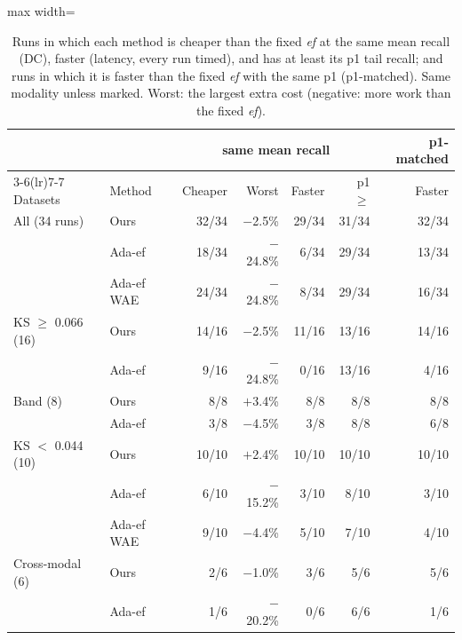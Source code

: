 \documentclass[twocolumn]{svjour3}
\newcommand{\ef}{\textit{ef}}
\begin{document}
\begin{table}[t]
  \caption{Runs in which each method is cheaper than the fixed \ef{} at the same mean recall (DC),
  faster (latency, every run timed), and has at least its p1 tail recall; and runs in which it is
  faster than the fixed \ef{} with the same p1 (p1-matched). Same modality unless marked. Worst:
  the largest extra cost (negative: more work than the fixed \ef{}).}
  \label{tab:counts}
  \centering\footnotesize\setlength{\tabcolsep}{3.5pt}
  \begin{adjustbox}{max width=\linewidth}\begin{tabular}{llrrrrr}
    \toprule
    & & \multicolumn{4}{c}{same mean recall} & p1-matched \\
    \cmidrule(lr){3-6}\cmidrule(lr){7-7}
    Datasets & Method & Cheaper & Worst & Faster & p1 $\geq$ & Faster \\
    \midrule
    All (34 runs)        & Ours        & 32/34 & $-$2.5\%  & 29/34 & 31/34 & 32/34 \\
                         & Ada-ef      & 18/34 & $-$24.8\% &  6/34 & 29/34 & 13/34 \\
                         & Ada-ef WAE  & 24/34 & $-$24.8\% &  8/34 & 29/34 & 16/34 \\
    \midrule
    KS $\geq$ 0.066 (16) & Ours        & 14/16 & $-$2.5\%  & 11/16 & 13/16 & 14/16 \\
                         & Ada-ef      &  9/16 & $-$24.8\% &  0/16 & 13/16 &  4/16 \\
    Band (8)             & Ours        &   8/8 & $+$3.4\%  &   8/8 &   8/8 &   8/8 \\
                         & Ada-ef      &   3/8 & $-$4.5\%  &   3/8 &   8/8 &   6/8 \\
    KS $<$ 0.044 (10)    & Ours        & 10/10 & $+$2.4\%  & 10/10 & 10/10 & 10/10 \\
                         & Ada-ef      &  6/10 & $-$15.2\% &  3/10 &  8/10 &  3/10 \\
                         & Ada-ef WAE  &  9/10 & $-$4.4\%  &  5/10 &  7/10 &  4/10 \\
    \midrule
    Cross-modal (6)      & Ours        &   2/6 & $-$1.0\%  &   3/6 &   5/6 &   5/6 \\
                         & Ada-ef      &   1/6 & $-$20.2\% &   0/6 &   6/6 &   1/6 \\
    \bottomrule
  \end{tabular}\end{adjustbox}
\end{table}
\end{document}
